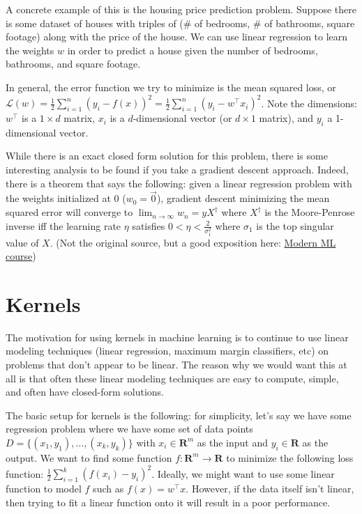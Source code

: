 \documentclass[answers,12pt]{exam}
\begin{document}
A concrete example of this is the housing price prediction problem.
Suppose there is some dataset of houses with triples of (\# of bedrooms, \# of bathrooms, square footage) along with the price of the house.
We can use linear regression to learn the weights $w$ in order to predict a house given the number of bedrooms, bathrooms, and square footage.

In general, the error function we try to minimize is the mean squared loss, or $\mathcal{L}(w) = \frac{1}{2} \sum_{i=1}^{n} {(y_i - f(x))}^2 = \frac{1}{2} \sum_{i=1}^{n} {(y_i - w^{\top}x_i)}^2$.
Note the dimensions: $w^{\top}$ is a $1 \times d$ matrix, $x_i$ is a $d$-dimensional vector (or $d \times 1$ matrix), and $y_i$ a 1-dimensional vector.

While there is an exact closed form solution for this problem, there is some interesting analysis to be found if you take a gradient descent approach. 
Indeed, there is a theorem that says the following: 
given a linear regression problem with the weights initialized at 0 ($w_0 = \vec{0}$), gradient descent minimizing the mean squared error will converge to $\lim_{n \to \infty} w_{n} = yX^{\dagger}$ where $X^{\dagger}$ is the Moore-Penrose inverse iff the learning rate $\eta$ satisfies $0 < \eta < \frac{2}{\sigma_1^2}$ where $\sigma_1$ is the top singular value of $X$.
(Not the original source, but a good exposition here: \href{https://web.mit.edu/modernml/course/lectures/MLClassLecture2.pdf}{Modern ML course})


\section{Kernels}
The motivation for using kernels in machine learning is to continue to use linear modeling techniques (linear regression, maximum margin classifiers, etc) on problems that don't appear to be linear.
The reason why we would want this at all is that often these linear modeling techniques are easy to compute, simple, and often have closed-form solutions.

The basic setup for kernels is the following:
for simplicity, let's say we have some regression problem where we have some set of data points $D= \{(x_1,y_1),\dots, (x_k,y_k)\}$  with $x_i \in \mathbf{R}^m$ as the input and $y_i \in \mathbf{R}$ as the output.
We want to find some function $f: \mathbf{R}^m \to \mathbf{R}$ to minimize the following loss function: $\frac{1}{2}\sum_{i=1}^{k}{(f(x_i)-y_i)}^2$.
Ideally, we might want to use some linear function to model $f$ such as $f(x) = w^{\top}x$.
However, if the data itself isn't linear, then trying to fit a linear function onto it will result in a poor performance.
\end{document}
